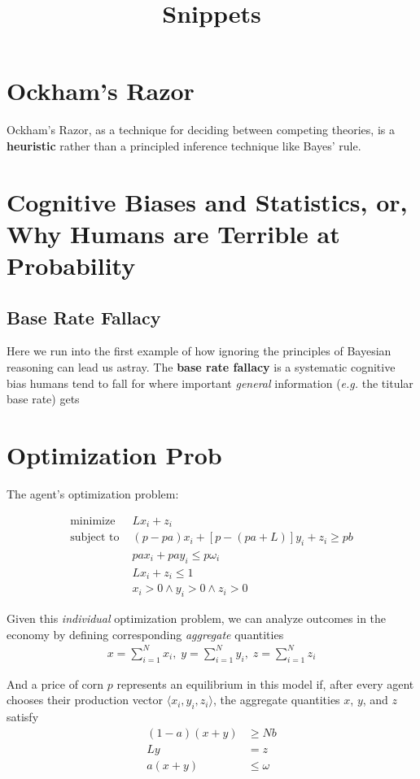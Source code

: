 \documentclass{article}
\title{Snippets}
\newcommand{\term}[1]{\textbf{#1}}
\newcommand{\eg}[0]{\textit{e.g.}}
\begin{document}
\maketitle

\section{Ockham's Razor}

Ockham's Razor, as a technique for deciding between competing theories, is a \term{heuristic} rather than a principled inference technique like Bayes' rule.

\section{Cognitive Biases and Statistics, or, Why Humans are Terrible at Probability}

\subsection{Base Rate Fallacy}

Here we run into the first example of how ignoring the principles of Bayesian reasoning can lead us astray. The \term{base rate fallacy} is a systematic cognitive bias humans tend to fall for where important \textit{general} information (\eg{} the titular base rate) gets 

\section{Optimization Prob}

The agent's optimization problem:

\begin{align}
\text{minimize } & Lx_i + z_i \\
\text{subject to } & (p-pa)x_i + [p - (pa + L)]y_i + z_i \geq pb \\
 & pax_i + pay_i \leq p\omega_i \\
 & Lx_i + z_i \leq 1 \\
 & x_i > 0 \wedge y_i > 0 \wedge z_i > 0
\end{align}

Given this \textit{individual} optimization problem, we can analyze outcomes in the economy by defining corresponding \textit{aggregate} quantities
\begin{align*}
x = \sum_{i=1}^N x_i, \; y = \sum_{i=1}^N y_i, \; z = \sum_{i=1}^N z_i
\end{align*}

And a price of corn $p$ represents an equilibrium in this model if, after every agent chooses their production vector $\langle x_i, y_i, z_i\rangle$, the aggregate quantities $x$, $y$, and $z$ satisfy
\begin{align}
(1-a)(x+y) &\geq Nb \\
Ly &= z \\
a(x + y) &\leq \omega
\end{align} 
\end{document}
